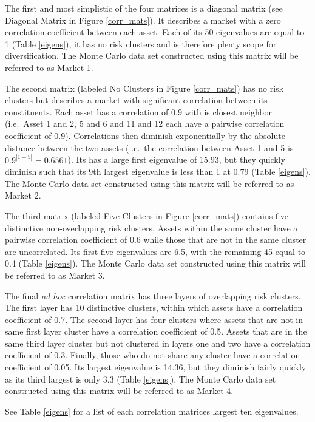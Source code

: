 \documentclass[11pt,preprint, authoryear]{elsarticle}
\numberwithin{equation}{section}
\numberwithin{figure}{section}
\numberwithin{table}{section}
\begin{document}
The first and most simplistic of the four matrices is a diagonal matrix
(see Diagonal Matrix in Figure \ref{corr_mats}). It describes a market
with a zero correlation coefficient between each asset. Each of its 50
eigenvalues are equal to 1 (Table \ref{eigens}), it has no risk clusters
and is therefore plenty scope for diversification. The Monte Carlo data
set constructed using this matrix will be referred to as Market 1.

The second matrix (labeled No Clusters in Figure \ref{corr_mats}) has no
risk clusters but describes a market with significant correlation
between its constituents. Each asset has a correlation of 0.9 with is
closest neighbor (i.e.~Asset 1 and 2, 5 and 6 and 11 and 12 each have a
pairwise correlation coefficient of 0.9). Correlations then diminish
exponentially by the absolute distance between the two assets (i.e.~the
correlation between Asset 1 and 5 is \(0.9^{|1-5|}=0.6561\)). Its has a
large first eigenvalue of 15.93, but they quickly diminish such that its
9th largest eigenvalue is less than 1 at 0.79 (Table \ref{eigens}). The
Monte Carlo data set constructed using this matrix will be referred to
as Market 2.

The third matrix (labeled Five Clusters in Figure \ref{corr_mats})
contains five distinctive non-overlapping risk clusters. Assets within
the same cluster have a pairwise correlation coefficient of 0.6 while
those that are not in the same cluster are uncorrelated. Its first five
eigenvalues are 6.5, with the remaining 45 equal to 0.4 (Table
\ref{eigens}). The Monte Carlo data set constructed using this matrix
will be referred to as Market 3.

The final \emph{ad hoc} correlation matrix has three layers of
overlapping risk clusters. The first layer has 10 distinctive clusters,
within which assets have a correlation coefficient of 0.7. The second
layer has four clusters where assets that are not in same first layer
cluster have a correlation coefficient of 0.5. Assets that are in the
same third layer cluster but not clustered in layers one and two have a
correlation coefficient of 0.3. Finally, those who do not share any
cluster have a correlation coefficient of 0.05. Its largest eigenvalue
is 14.36, but they diminish fairly quickly as its third largest is only
3.3 (Table \ref{eigens}). The Monte Carlo data set constructed using
this matrix will be referred to as Market 4.

See Table \ref{eigens} for a list of each correlation matrices largest
ten eigenvalues.
\end{document}
